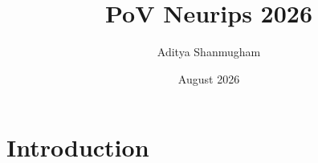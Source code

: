 \documentclass{article}
\title{PoV Neurips 2026}
\author{Aditya Shanmugham}
\date{August 2026}
\begin{document}
\maketitle

\section{Introduction}
\end{document}
